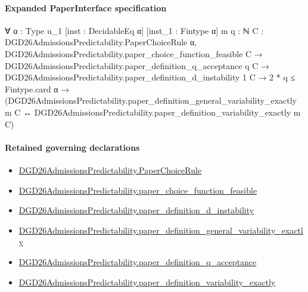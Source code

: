 \documentclass[10pt]{article}
\begin{document}
\paragraph{Expanded PaperInterface specification}
\begin{ReviewVerbatim}
∀ {α : Type u_1} [inst : DecidableEq α] [inst_1 : Fintype α] {m q : ℕ}
  {C : DGD26AdmissionsPredictability.PaperChoiceRule α},
  DGD26AdmissionsPredictability.paper_choice_function_feasible C →
    DGD26AdmissionsPredictability.paper_definition_q_acceptance q C →
      DGD26AdmissionsPredictability.paper_definition_d_instability 1 C →
        2 * q ≤ Fintype.card α →
          (DGD26AdmissionsPredictability.paper_definition_general_variability_exactly m C ↔
            DGD26AdmissionsPredictability.paper_definition_variability_exactly m C)
\end{ReviewVerbatim}

\paragraph{Retained governing declarations}
\begin{itemize}\raggedright
\item \hyperlink{governing-declaration-4678951b4432b184}{DGD26\allowbreak{}Admissions\allowbreak{}Predictability.\allowbreak{}Paper\allowbreak{}Choice\allowbreak{}Rule}
\item \hyperlink{governing-declaration-f7de74a44053f6d5}{DGD26\allowbreak{}Admissions\allowbreak{}Predictability.\allowbreak{}paper\_\allowbreak{}choice\_\allowbreak{}function\_\allowbreak{}feasible}
\item \hyperlink{governing-declaration-ce2c1c7a5233a84a}{DGD26\allowbreak{}Admissions\allowbreak{}Predictability.\allowbreak{}paper\_\allowbreak{}definition\_\allowbreak{}d\_\allowbreak{}instability}
\item \hyperlink{governing-declaration-e5d4c91e9557ba2a}{DGD26\allowbreak{}Admissions\allowbreak{}Predictability.\allowbreak{}paper\_\allowbreak{}definition\_\allowbreak{}general\_\allowbreak{}variability\_\allowbreak{}exactly}
\item \hyperlink{governing-declaration-7ecd62274fb2f391}{DGD26\allowbreak{}Admissions\allowbreak{}Predictability.\allowbreak{}paper\_\allowbreak{}definition\_\allowbreak{}q\_\allowbreak{}acceptance}
\item \hyperlink{governing-declaration-ce6697be3f1c2256}{DGD26\allowbreak{}Admissions\allowbreak{}Predictability.\allowbreak{}paper\_\allowbreak{}definition\_\allowbreak{}variability\_\allowbreak{}exactly}
\end{itemize}
\end{document}
